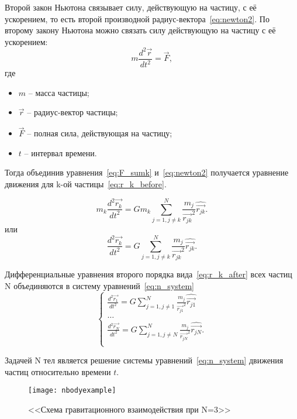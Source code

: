 Второй закон Ньютона связывает силу, действующую на частицу, с её ускорением, то есть второй производной радиус-вектора~\ref{eq:newton2}.
По второму закону Ньютона можно связать силу действующую на частицу с её ускорением:
\begin{equation}
	\label{eq:newton2}
	m\frac{d^2\vec{r}}{dt^2} = \vec{F},
\end{equation}
где
\begin{itemize}
	\item $m$ -- масса частицы;
	\item $\vec{r}$ -- радиус-вектор частицы;
	\item $\vec{F}$ -- полная сила, действующая на частицу;
	\item $t$ -- интервал времени.
\end{itemize}

Тогда объединив уравнения~\ref{eq:F_sumk} и~\ref{eq:newton2} получается уравнение движения для k-ой частицы~\ref{eq:r_k_before}.
 
 \begin{equation}
 	\label{eq:r_k_before}
 	m_k\frac{d^2\vec{r_k}}{dt^2} = Gm_k\sum_{j=1, j \neq k}^{N}{\frac{m_j}{\vec{r_{jk}}^2}\hat{\vec{r_{jk}}}}.
 \end{equation}
 или
 \begin{equation}
 	\label{eq:r_k_after}
 	\frac{d^2\vec{r_k}}{dt^2} = G\sum_{j=1, j \neq k}^{N}{\frac{m_j}{\vec{r_{jk}}^2}\hat{\vec{r_{jk}}}}.
 \end{equation}
 
 Дифференциальные уравнения второго порядка вида~\ref{eq:r_k_after} всех частиц N объединяются в систему уравнений~\ref{eq:n_system}
  \begin{equation}
 	\label{eq:n_system}
 	\begin{cases}
 		\frac{d^2\vec{r_1}}{dt^2} = G\sum_{j=1, j \neq 1}^{N}{\frac{m_j}{\vec{r_{j1}}^2}\hat{\vec{r_{j1}}}} \\
 		\dots \\
 		\frac{d^2\vec{r_N}}{dt^2} = G\sum_{j=1, j \neq N}^{N}{\frac{m_j}{\vec{r_{jN}}^2}\hat{\vec{r_{jN}}}}. \\
 	\end{cases}
 \end{equation}

Задачей N тел является решение системы уравнений~\ref{eq:n_system} движения частиц относительно времени $t$.

\begin{figure}[h]
	\centering
	\texttt{[image: nbodyexample]}
	\caption{<<Схема гравитационного взаимодействия при N=3>>}
	\label{fig:nbodyexample}
\end{figure}
